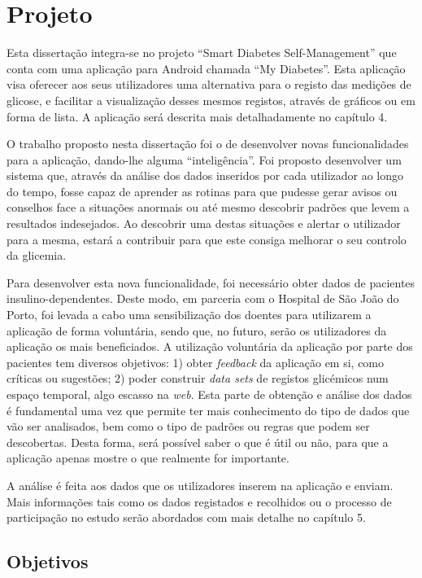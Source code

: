 \section{Projeto}


Esta dissertação integra-se no projeto ``Smart Diabetes Self-Management'' que conta com uma aplicação para Android chamada ``My Diabetes''. Esta aplicação visa oferecer aos seus utilizadores uma alternativa para o registo das medições de glicose, e facilitar a visualização desses mesmos registos, através de gráficos ou em forma de lista. A aplicação será descrita mais detalhadamente no capítulo 4. 

O trabalho proposto nesta dissertação foi o de desenvolver novas funcionalidades para a aplicação, dando-lhe alguma ``inteligência''. Foi proposto desenvolver um sistema que, através da análise dos dados inseridos por cada utilizador ao longo do tempo, fosse capaz de aprender as rotinas para que pudesse gerar avisos ou conselhos face a situações anormais ou até mesmo descobrir padrões que levem a resultados indesejados. Ao descobrir uma destas situações e alertar o utilizador para a mesma, estará a contribuir para que este consiga melhorar o seu controlo da glicemia.

Para desenvolver esta nova funcionalidade, foi necessário obter dados de pacientes insulino-dependentes. Deste modo, em parceria com o Hospital de São João do Porto, foi levada a cabo uma sensibilização dos doentes para utilizarem a aplicação de forma voluntária, sendo que, no futuro, serão os utilizadores da aplicação os mais beneficiados.
A utilização voluntária da aplicação por parte dos pacientes tem diversos objetivos: 1) obter \textit{feedback} da aplicação em si, como críticas ou sugestões; 2) poder construir \textit{data sets} de registos glicémicos num espaço temporal, algo escasso na \textit{web}. Esta parte de obtenção e análise dos dados é fundamental uma vez que permite ter mais conhecimento do tipo de dados que vão ser analisados, bem como o tipo de padrões ou regras que podem ser descobertas. Desta forma, será possível saber o que é útil ou não, para que a aplicação apenas mostre o que realmente for importante. 

A análise é feita aos dados que os utilizadores inserem na aplicação e enviam. Mais informações tais como os dados registados e recolhidos ou o processo de participação no estudo serão abordados com mais detalhe no capítulo 5.


\subsection{Objetivos}

